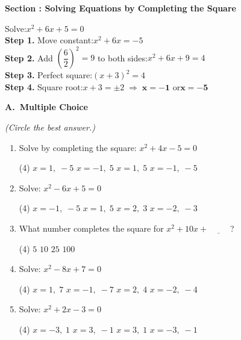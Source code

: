 \documentclass[12pt,letterpaper]{article}
\newcounter{sectionnum}
\newcommand{\worksheetsection}[1]{%
  \stepcounter{sectionnum}%
  \vspace{10pt}%
  \noindent\colorbox{navyblue}{%
    \parbox{\dimexpr\linewidth-2\fboxsep\relax}{%
      \strut\color{white}\bfseries\large
      Section \thesectionnum: #1%
    }%
  }%
  \par\vspace{4pt}%
}
\newcommand{\worksheetsubsection}[1]{%
  \vspace{4pt}%
  {\noindent\small\bfseries\color{navyblue}#1}\par\vspace{2pt}%
}
\begin{document}
\newpage
\worksheetsection{Solving Equations by Completing the Square}

\begin{tcolorbox}[examplebox]
  Solve:\quad $x^2 + 6x + 5 = 0$\\[4pt]
  \textbf{Step 1.} Move constant:\quad $x^2 + 6x = -5$\\
  \textbf{Step 2.} Add $\left(\dfrac{6}{2}\right)^2 = 9$ to both sides:\quad $x^2 + 6x + 9 = 4$\\[2pt]
  \textbf{Step 3.} Perfect square:\quad $(x+3)^2 = 4$\\
  \textbf{Step 4.} Square root:\quad $x+3 = \pm 2 \;\Rightarrow\; \boldsymbol{x = -1}$ \quad or\quad $\boldsymbol{x=-5}$
\end{tcolorbox}

\worksheetsubsection{A.\ Multiple Choice} \textit{(Circle the best answer.)}

\begin{enumerate}[label=\textbf{\arabic*.}, leftmargin=*, itemsep=10pt]

  \item Solve by completing the square: $x^2 + 4x - 5 = 0$
  \begin{tasks}(4)
    \task $x=1,\;-5$
    \task $x=-1,\;5$
    \task $x=1,\;5$
    \task $x=-1,\;-5$
  \end{tasks}

  \item Solve: $x^2 - 6x + 5 = 0$
  \begin{tasks}(4)
    \task $x=-1,\;-5$
    \task $x=1,\;5$
    \task $x=2,\;3$
    \task $x=-2,\;-3$
  \end{tasks}

  \item What number completes the square for $x^2 + 10x + \underline{\hspace{1cm}}$\,?
  \begin{tasks}(4)
    \task $5$
    \task $10$
    \task $25$
    \task $100$
  \end{tasks}

  \item Solve: $x^2 - 8x + 7 = 0$
  \begin{tasks}(4)
    \task $x=1,\;7$
    \task $x=-1,\;-7$
    \task $x=2,\;4$
    \task $x=-2,\;-4$
  \end{tasks}

  \item Solve: $x^2 + 2x - 3 = 0$
  \begin{tasks}(4)
    \task $x=-3,\;1$
    \task $x=3,\;-1$
    \task $x=3,\;1$
    \task $x=-3,\;-1$
  \end{tasks}

\end{enumerate}
\end{document}
